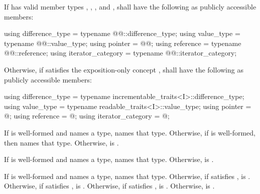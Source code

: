 \begin{itemize}
\item
If  has valid member
types , , 
, and ,
shall have the following as publicly accessible members:
\begin{codeblock}
  using difference_type   = typename @@::difference_type;
  using value_type        = typename @@::value_type;
  using pointer           = @\newtxt{\seebelownc}@;
  using reference         = typename @@::reference;
  using iterator_category = typename @@::iterator_category;
\end{codeblock}

{\color{newclr}
\item
Otherwise, if  satisfies the exposition-only concept
,  shall
have the following as publicly accessible members:
\begin{codeblock}
  using difference_type   = typename incrementable_traits<I>::difference_type;
  using value_type        = typename readable_traits<I>::value_type;
  using pointer           = @\seebelownc@;
  using reference         = @\seebelownc@;
  using iterator_category = @\seebelownc@;
\end{codeblock}
If  is well-formed and names a type,  names
that type. Otherwise, if 
is well-formed, then  names that type.  Otherwise, 
is .

If  is well-formed and names a type, 
names that type. Otherwise,  is .

If  is well-formed and names a type,
 names that type. Otherwise, if 
satisfies , 
is . Otherwise, if 
satisfies , 
is . Otherwise, if 
satisfies , 
is . Otherwise, 
is .

}
\end{itemize}
